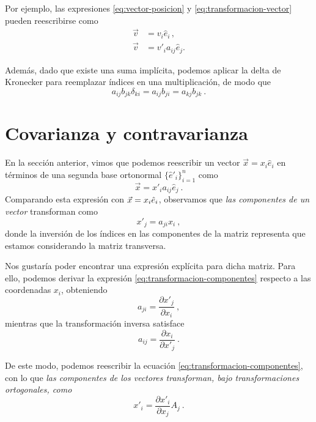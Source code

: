 Por ejemplo, las expresiones \eqref{eq:vector-posicion} y \eqref{eq:transformacion-vector} pueden reescribirse como
\begin{align}
    \vec{v} & = v_i \hat{e}_i \, , \\
    \vec{v} & = v'_i a_{ij} \hat{e}_j .
\end{align}

Además, dado que existe una suma implícita, podemos aplicar la delta de Kronecker para reemplazar índices en una multiplicación, de modo que
\begin{equation}
    a_{ij} b_{jk} \delta_{ki} = a_{ij} b_{ji} = a_{kj} b_{jk} \ .
\end{equation}

\section{Covarianza y contravarianza}

En la sección anterior, vimos que podemos reescribir un vector $\vec{x} = x_i \hat{e}_i$ en términos de una segunda base ortonormal $\{\hat{e}'_i\}_{i=1}^n$ como
\begin{equation} \label{eq:transformacion-vector}
    \vec{x} = x'_i a_{ij} \hat{e}_j \ .
\end{equation}
Comparando esta expresión con $\vec{x} = x_i \hat{e}_i$, observamos que \emph{las componentes de un vector} transforman como
\begin{equation} \label{eq:transformacion-componentes}
    x'_j = a_{ji} x_i \ , 
\end{equation}
donde la inversión de los índices en las componentes de la matriz representa que estamos considerando la matriz transversa.

Nos gustaría poder encontrar una expresión explícita para dicha matriz. Para ello, podemos derivar la expresión \eqref{eq:transformacion-componentes} respecto a las coordenadas $x_i$, obteniendo
\begin{equation}
    a_{ji} = \frac{\partial x'_j}{\partial x_i} \ ,
\end{equation}
mientras que la transformación inversa satisface
\begin{equation}
    a_{ij} = \frac{\partial x_i}{\partial x'_j} \ .
\end{equation}

De este modo, podemos reescribir la ecuación \eqref{eq:transformacion-componentes}, con lo que \emph{las componentes de los vectores transforman, bajo transformaciones ortogonales, como}
\begin{equation}
    x'_i = \frac{\partial x'_i}{\partial x_j} A_j \ .
\end{equation}

